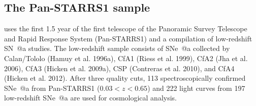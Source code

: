 \documentclass[12pt,a4paper]{article}
\makeatletter
\newcommand*{\rom}[1]{\expandafter\@slowromancap\romannumeral #1@}
\newcommand{\sna}{\mbox{SN \rom{1}a}}
\newcommand{\snea}{\mbox{SNe \rom{1}a}}
\makeatother
\begin{document}
\subsection{The Pan-STARRS1 sample}
\label{sec:rest}

\citet{rest2014} uses the first 1.5 year of the first telescope of 
the Panoramic Survey Telescope and Rapid Response System (Pan-STARRS1) 
and a compilation of low-redshift {\sna} studies. The low-redshift 
sample consists of {\snea} collected by Calan/Tololo (Hamuy et al. 1996a), 
CfA1 (Riess et al. 1999), CfA2 (Jha et al. 2006), CfA3 (Hicken et al. 2009a), 
CSP (Contreras et al. 2010), and CfA4 (Hicken et al. 2012). After 
three quality cuts, 113 spectroscopically confirmed {\snea} from 
Pan-STARRS1 ($0.03 < z < 0.65$) and 222 light curves from 197 
low-redshift {\snea} are used for cosmological analysis. 
\end{document}
